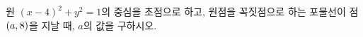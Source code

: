 원 $(x-4)^2+y^2=1$의 중심을 초점으로 하고, 원점을 꼭짓점으로 하는 포물선이 점 $(a{,}\mkern3mu\mathopen{}8)$을 지날 때, $a$의 값을 구하시오.
